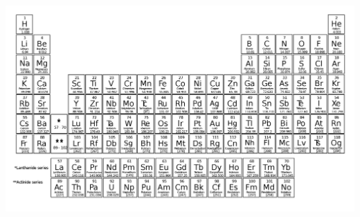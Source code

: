 \documentclass[12pt]{exam}		%
\begin{document}
\begin{center}
  \includegraphics[scale=0.26,angle=90]{periodic_table}
\end{center}
\end{document}
